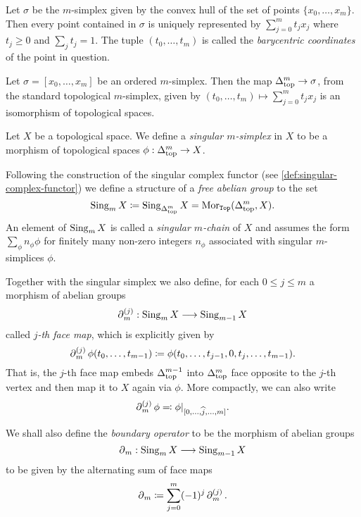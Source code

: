 \begin{corollary}
\label{cor:barycentric-coordinates-simplex}
Let \(\sigma\) be the \(m\)-simplex given by the convex hull of the set of
points \(\{x_0, \dots, x_m\}\). Then every point contained in \(\sigma\) is
uniquely represented by \(\sum_{j=0}^m t_j x_j\) where \(t_j \geq 0\) and
\(\sum_j t_j = 1\). The tuple \((t_0, \dots, t_m)\) is called the
\emph{barycentric coordinates} of the point in question.
\end{corollary}

\begin{corollary}
\label{cor:ordered-simplex-iso-standard-simplex}
Let \(\sigma = [x_0, \dots, x_m]\) be an ordered \(m\)-simplex. Then the  map
\(\Delta_{\text{top}}^m \to \sigma\), from the standard topological \(m\)-simplex, given by
\((t_0, \dots, t_m) \mapsto \sum_{j=0}^m t_j x_j\) is an isomorphism of
topological spaces.
\end{corollary}

\begin{definition}
\label{def:singular-simplex}
Let \(X\) be a topological space. We define a \emph{singular \(m\)-simplex} in
\(X\) to be a morphism of topological spaces \(\phi: \Delta_{\text{top}}^m \to X\).

Following the construction of the singular complex functor (see
\cref{def:singular-complex-functor}) we define a structure of a \emph{free
  abelian group} to the set
\[
\operatorname{Sing}_m X \coloneq \operatorname{Sing}_{\Delta_{\text{top}}^m} X = \operatorname{Mor}_{{\texttt{Top}}}(\Delta_{\text{top}}^m, X).
\]
An element of \(\operatorname{Sing}_m X\) is called a \emph{singular \(m\)-chain} of \(X\) and
assumes the form \(\sum_{\phi} n_{\phi} \phi\) for finitely many non-zero
integers \(n_{\phi}\) associated with singular \(m\)-simplices \(\phi\).

Together with the singular simplex we also define, for each \(0 \leq j \leq m\)
a morphism of abelian groups
\[
\operatorname{\partial}_m^{(j)}: \operatorname{Sing}_m X \longrightarrow \operatorname{Sing}_{m-1} X
\]
called \emph{\(j\)-th face map}, which is explicitly given by
\[
\operatorname{\partial}_m^{(j)} \phi(t_0, \dots, t_{m-1})
\coloneq \phi(t_0, \dots, t_{j-1}, 0, t_j, \dots, t_{m-1}).
\]
That is, the \(j\)-th face map embeds \(\Delta_{\text{top}}^{m-1}\) into \(\Delta_{\text{top}}^m\)
face opposite to the \(j\)-th vertex and then map it to \(X\) again via
\(\phi\). More compactly, we can also write
\[
\operatorname{\partial}_m^{(j)} \phi \eqqcolon \phi|_{[0, \dots, \widehat j, \dots, m]}.
\]

We shall also define the \emph{boundary operator} to be the morphism
of abelian groups
\[
\operatorname{\partial}_m: \operatorname{Sing}_m X \longrightarrow \operatorname{Sing}_{m-1} X
\]
to be given by the alternating sum of face maps
\[
\operatorname{\partial}_m \coloneq \sum_{j=0}^m (-1)^j \operatorname{\partial}_m^{(j)}.
\]
\end{definition}

